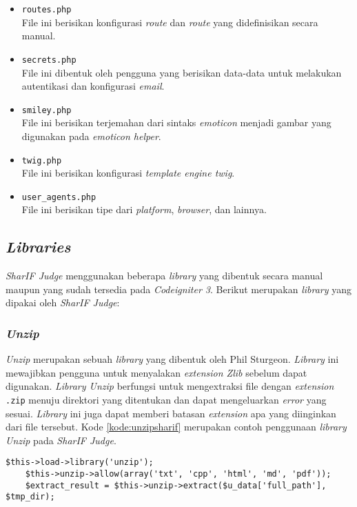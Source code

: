 \begin{itemize}
	\item \texttt{routes.php} \\File ini berisikan konfigurasi \textit{route} dan \textit{route} yang didefinisikan secara manual.
	\item \texttt{secrets.php} \\File ini dibentuk oleh pengguna yang berisikan data-data untuk melakukan autentikasi dan konfigurasi \textit{email}.
	\item \texttt{smiley.php} \\File ini berisikan terjemahan dari sintaks \textit{emoticon} menjadi gambar yang digunakan pada \textit{emoticon helper}.
	\item \texttt{twig.php} \\File ini berisikan konfigurasi \textit{template engine twig}.
	\item \texttt{user\_agents.php} \\File ini berisikan tipe dari \textit{platform}, \textit{browser}, dan lainnya.
\end{itemize}

\subsection{\textit{Libraries}}
\textit{SharIF Judge} menggunakan beberapa \textit{library} yang dibentuk secara manual maupun yang sudah tersedia pada \textit{Codeigniter 3}. Berikut merupakan \textit{library} yang dipakai oleh \textit{SharIF Judge}:

\subsubsection{\textit{Unzip}}
\textit{Unzip} merupakan sebuah \textit{library} yang dibentuk oleh Phil Sturgeon. \textit{Library} ini mewajibkan pengguna untuk menyalakan \textit{extension Zlib} sebelum dapat digunakan. \textit{Library Unzip} berfungsi untuk mengextraksi file dengan \textit{extension} \texttt{.zip} menuju direktori yang ditentukan dan dapat mengeluarkan \textit{error} yang sesuai. \textit{Library} ini juga dapat memberi batasan \textit{extension} apa yang diinginkan dari file tersebut. Kode \ref{kode:unzipsharif} merupakan contoh penggunaan \textit{library Unzip} pada \textit{SharIF Judge}.

\begin{lstlisting}[caption=Contoh kode penggunaan \textit{Library Unzip}, label=kode:unzipsharif]
	$this->load->library('unzip');
	$this->unzip->allow(array('txt', 'cpp', 'html', 'md', 'pdf'));
	$extract_result = $this->unzip->extract($u_data['full_path'], $tmp_dir);
\end{lstlisting}


